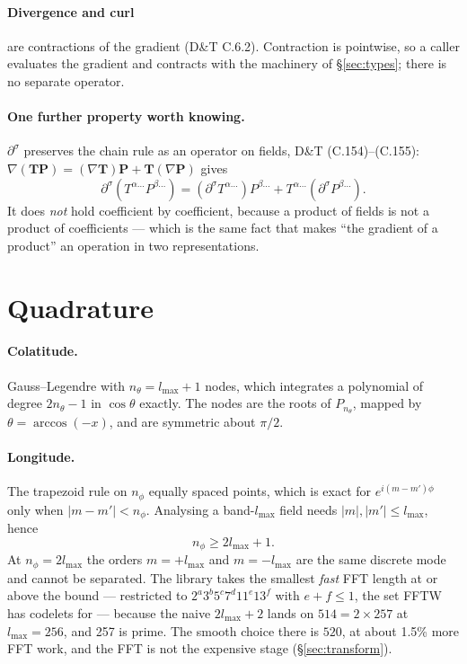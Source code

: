\documentclass[11pt,a4paper]{article}
\begin{document}
\paragraph{Divergence and curl} are contractions of the gradient (D\&T
C.6.2).  Contraction is pointwise, so a caller evaluates the gradient and
contracts with the machinery of \S\ref{sec:types}; there is no separate
operator.

\paragraph{One further property worth knowing.}  $\partial^{\sigma}$
preserves the chain rule as an operator on fields, D\&T (C.154)--(C.155):
$\nabla(\mathbf{T}\mathbf{P}) = (\nabla\mathbf{T})\mathbf{P} +
\mathbf{T}(\nabla\mathbf{P})$ gives
\begin{equation}
  \partial^\sigma(T^{\alpha\ldots}P^{\beta\ldots}) =
  (\partial^\sigma T^{\alpha\ldots})P^{\beta\ldots} +
  T^{\alpha\ldots}(\partial^\sigma P^{\beta\ldots}).
  \label{eq:leibniz}
\end{equation}
It does \emph{not} hold coefficient by coefficient, because a product of
fields is not a product of coefficients --- which is the same fact that
makes ``the gradient of a product'' an operation in two representations.

\section{Quadrature}
\label{sec:quadrature}

\paragraph{Colatitude.}  Gauss--Legendre with $n_\theta = l_{\max}+1$
nodes, which integrates a polynomial of degree $2n_\theta-1$ in
$\cos\theta$ exactly.  The nodes are the roots of $P_{n_\theta}$, mapped
by $\theta = \arccos(-x)$, and are symmetric about $\pi/2$.

\paragraph{Longitude.}  The trapezoid rule on $n_\phi$ equally spaced
points, which is exact for $e^{i(m-m')\phi}$ only when $|m-m'| < n_\phi$.
Analysing a band-$l_{\max}$ field needs $|m|,|m'|\leq l_{\max}$, hence
\begin{equation}
  n_\phi \geq 2 l_{\max} + 1.
  \label{eq:nphi}
\end{equation}
At $n_\phi = 2l_{\max}$ the orders $m=+l_{\max}$ and $m=-l_{\max}$ are the
same discrete mode and cannot be separated.  The library takes the
smallest \emph{fast} FFT length at or above the bound --- restricted to
$2^a 3^b 5^c 7^d 11^e 13^f$ with $e+f\leq 1$, the set FFTW has codelets
for --- because the naive $2l_{\max}+2$ lands on $514 = 2\times 257$ at
$l_{\max}=256$, and 257 is prime.  The smooth choice there is $520$, at
about 1.5\% more FFT work, and the FFT is not the expensive stage
(\S\ref{sec:transform}).
\end{document}
